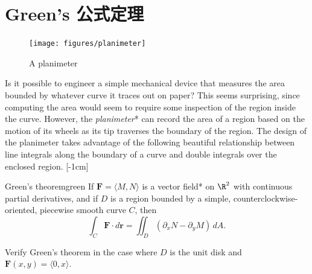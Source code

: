 \documentclass[indent]{watsonbook}
\begin{document}
\section{Green's 公式定理} \label{sec:greens}


\begin{figure}
  \texttt{[image: figures/planimeter]}
  \caption{A planimeter \label{fig:planimeter}}
\end{figure}

Is it possible to engineer a simple mechanical device that measures
the area bounded by whatever curve it traces out on paper? This seems
surprising, since computing the area would seem to require some
inspection of the region inside the curve. However, the
\textit{planimeter}* can record the area of a region based on the
motion of its wheels as its tip traverses the boundary of the
region. The design of the planimeter takes advantage of the following
beautiful relationship between line integrals along the boundary of a
curve and double integrals over the enclosed region. [-1cm]

\begin{theo}{Green's theorem}{green}
  If $\mathbf{F} = \langle M, N\rangle$ is a vector field* on $\R^2$
  with continuous partial derivatives, and if $D$ is a region bounded
  by a simple, counterclockwise-oriented, piecewise smooth curve $C$,
  then 
  \[
    \int_C \mathbf{F} \cdot {d}\mathbf{r} = \iint_D \left(\partial_x N -
      \partial_y M \right) \, {{d}}A.
  \]
\end{theo}

\begin{example}{}{}
  Verify Green's theorem in the case where $D$ is the unit disk and
  $\mathbf{F}(x,y)= \langle 0, x \rangle$.
\end{example}
\end{document}
